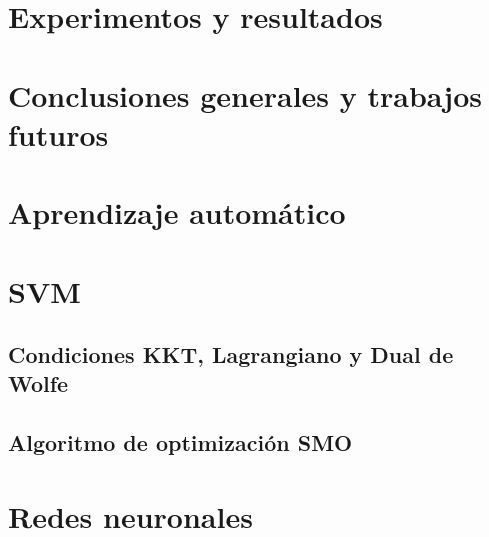 \documentclass[a4paper,12pt]{book}
\begin{document}
\chapter{Experimentos y resultados}

\chapter{Conclusiones generales y trabajos futuros}


\appendix

\chapter{Aprendizaje automático}
\label{apendice_validacion}
\renewcommand{\chapterid}{aprendizaje}

\chapter{SVM}
\label{apendice_svm}
\renewcommand{\chapterid}{svm}

  \section{Condiciones KKT, Lagrangiano y Dual de Wolfe}
  \label{sec:kkt}

  \section{Algoritmo de optimización SMO}
  \label{apendice_smo}


\chapter{Redes neuronales}

\renewcommand{\chapterid}{neuronales}
\label{apendice_neuronales}
  
  
\backmatter

	

\end{document}
